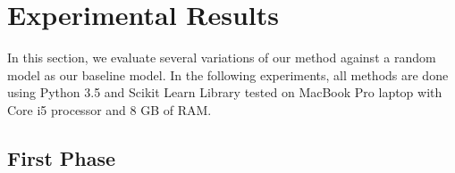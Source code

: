 %
%





\section{Experimental Results}
\label{sec:exp}

In this section, we evaluate several variations of our method against a random model as our baseline model. In the following experiments, all methods are done using Python 3.5 and Scikit Learn Library tested on MacBook Pro laptop with Core i5 processor and 8 GB of RAM.

\subsection{First Phase}

